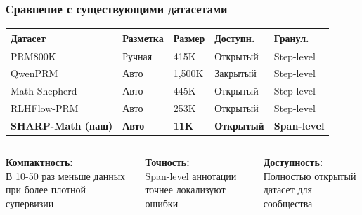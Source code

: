 \documentclass{beamer}
\begin{document}
\begin{frame}
  \frametitle{Сравнение с существующими датасетами}
  \scriptsize
  
  \begin{table}[h]
  \scriptsize
  \begin{tabularx}{\textwidth}{Y Y Y Y Y}
      \toprule
      \textbf{Датасет} & \textbf{Разметка} & \textbf{Размер} & \textbf{Доступн.} & \textbf{Гранул.} \\
      \midrule
      PRM800K & Ручная & 415K & Открытый & Step-level \\
      QwenPRM & Авто & 1,500K & Закрытый & Step-level \\
      Math-Shepherd & Авто & 445K & Открытый & Step-level \\
      RLHFlow-PRM & Авто & 253K & Открытый & Step-level \\
      \midrule
      \textbf{SHARP-Math (наш)} & \textbf{Авто} & \textbf{11K} & \textbf{Открытый} & \textbf{Span-level} \\
      \bottomrule
  \end{tabularx}
  \end{table}

  \vspace{0.5em}
  \begin{columns}[T]
      \begin{column}{0.3\textwidth}
          \scriptsize\textbf{Компактность:} \\ В 10-50 раз меньше данных при более плотной супервизии
      \end{column}
      \begin{column}{0.33\textwidth}
          \scriptsize\textbf{Точность:} \\ Span-level аннотации точнее локализуют ошибки
      \end{column}
      \begin{column}{0.3\textwidth}
          \scriptsize\textbf{Доступность:} \\ Полностью открытый датасет для сообщества
      \end{column}
  \end{columns}
\end{frame}
\end{document}
